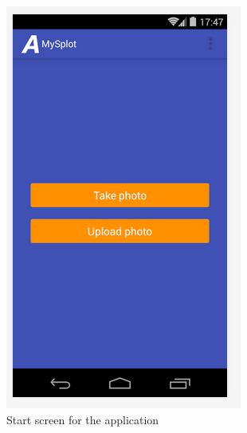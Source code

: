 \begin{figure}
\begin{minipage}{.45\linewidth}
	\centering
    \includegraphics[width=.8\linewidth]{./Sprint4/img/appStart.png}
    \caption{Start screen for the application}
    \label{fig:S4DesignImplAppStart}
\end{minipage}%
\hspace{0.1\linewidth}
\begin{minipage}{.45\linewidth}
	\centering

\end{minipage}
\end{figure}
